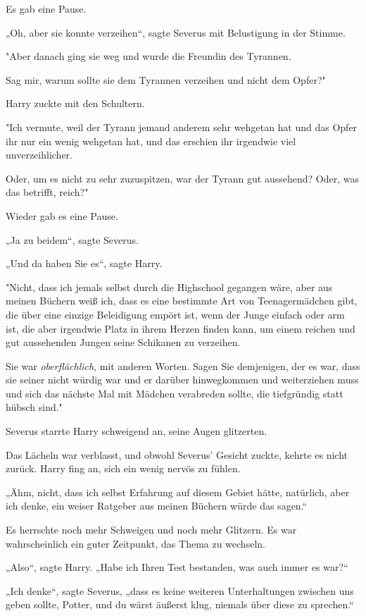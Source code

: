 {Es gab eine Pause.

„Oh, aber sie konnte verzeihen“, sagte Severus mit Belustigung in der Stimme.

"Aber danach ging sie weg und wurde die Freundin des Tyrannen.

Sag mir, warum sollte sie dem Tyrannen verzeihen und nicht dem Opfer?"

Harry zuckte mit den Schultern.

"Ich vermute, weil der Tyrann jemand anderem sehr wehgetan hat und das Opfer ihr nur ein wenig wehgetan hat, und das erschien ihr irgendwie viel unverzeihlicher.

Oder, um es nicht zu sehr zuzuspitzen, war der Tyrann gut aussehend? Oder, was das betrifft, reich?"

Wieder gab es eine Pause.

„Ja zu beidem“, sagte Severus.

„Und da haben Sie es“, sagte Harry.

"Nicht, dass ich jemals selbst durch die Highschool gegangen wäre, aber aus meinen Büchern weiß ich, dass es eine bestimmte Art von Teenagermädchen gibt, die über eine einzige Beleidigung empört ist, wenn der Junge einfach oder arm ist, die aber irgendwie Platz in ihrem Herzen finden kann, um einem reichen und gut aussehenden Jungen seine Schikanen zu verzeihen.

Sie war \emph{oberflächlich}, mit anderen Worten. Sagen Sie demjenigen, der es war, dass sie seiner nicht würdig war und er darüber hinwegkommen und weiterziehen muss und sich das nächste Mal mit Mädchen verabreden sollte, die tiefgründig statt hübsch sind."

Severus starrte Harry schweigend an, seine Augen glitzerten.

Das Lächeln war verblasst, und obwohl Severus' Gesicht zuckte, kehrte es nicht zurück. Harry fing an, sich ein wenig nervös zu fühlen.

„Ähm, nicht, dass ich selbst Erfahrung auf diesem Gebiet hätte, natürlich, aber ich denke, ein weiser Ratgeber aus meinen Büchern würde das sagen.“

Es herrschte noch mehr Schweigen und noch mehr Glitzern. Es war wahrscheinlich ein guter Zeitpunkt, das Thema zu wechseln.

„Also“, sagte Harry. „Habe ich Ihren Test bestanden, was auch immer es war?“

„Ich denke“, sagte Severus, „dass es keine weiteren Unterhaltungen zwischen uns geben sollte, Potter, und du wärst äußerst klug, niemals über diese zu sprechen.“

}
